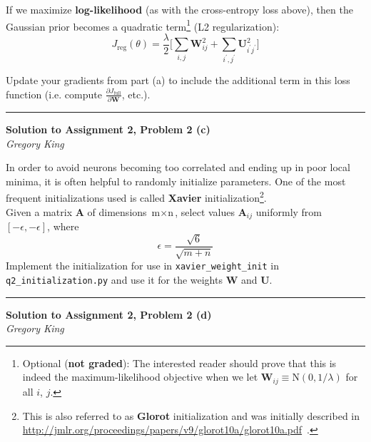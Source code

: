 \documentclass[letter,12pt]{article}
\newcommand{\myhwtitle}[3]
{\begin{center}
{\large {\bf Solution to Assignment {#1}, Problem {#2}}}\\
\medskip 
{\it {#3}} %
\end{center}}
\newcommand{\solutionsAuthor}{Gregory King}
\begin{document}
\noindent If we maximize \textbf{log-likelihood} (as with the cross-entropy loss above), then the Gaussian prior becomes a quadratic term\footnote{Optional (\textbf{not graded}): The interested reader should prove that this is indeed the maximum-likelihood objective when we let ${\boldsymbol W}_{ij} \equiv \textrm{N}(0, 1/\lambda)$ for all $i$, $j$.} (L2 regularization):
\begin{equation}
J_{\textrm{reg}}(\theta) = \frac{\lambda}{2}\big[\sum_{i,j}{\boldsymbol W}^{2}_{ij} + \sum_{i^{\prime},j^{\prime}}{\boldsymbol U}^{2}_{i^{\prime}j^{\prime}} \big]
\end{equation}

\noindent Update your gradients from part (a) to include the additional term in this loss function (i.e. compute $\frac{\partial J_{\textrm{full}}}{\partial{\boldsymbol W}}$, etc.).\vspace{5mm}

\noindent\rule{\textwidth}{0.4pt}

\clearpage

\myhwtitle{2}{2 (c)}{\solutionsAuthor}

\bigskip

\noindent In order to avoid neurons becoming too correlated and ending up in poor local minima, it is often helpful to randomly initialize parameters. One of the most frequent initializations used is called \textbf{Xavier} initialization\footnote{This is also referred to as \textbf{Glorot} initialization and was initially described in \url{http://jmlr.org/proceedings/papers/v9/glorot10a/glorot10a.pdf}~.}.\\

\noindent Given a matrix ${\boldsymbol A}$ of dimensions $\textrm{m}\times\textrm{n}$, select values ${\boldsymbol A}_{ij}$ uniformly from $[-\epsilon,-\epsilon]$, where\\
\begin{equation}
\epsilon = \frac{\sqrt{6}}{\sqrt{m+n}}
\end{equation}
Implement the initialization for use in \texttt{xavier\_weight\_init} in \texttt{q2\_initialization.py} and use it for the weights ${\boldsymbol W}$ and ${\boldsymbol U}$.

\vspace{5mm}
\noindent\rule{\textwidth}{0.4pt}

\clearpage

\myhwtitle{2}{2 (d)}{\solutionsAuthor}

\bigskip
\end{document}
